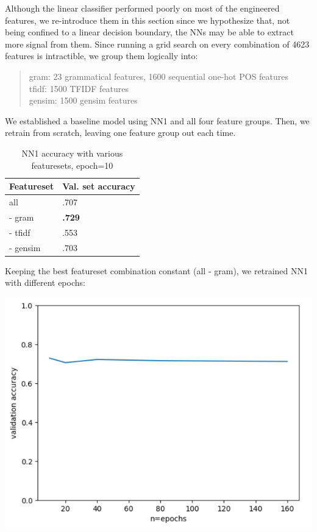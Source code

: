 \documentclass[8pt]{article}
\begin{document}
Although the linear classifier performed poorly on most of the engineered features, we re-introduce them in this section since we hypothesize that, not being confined to a linear decision boundary, the NNs may be able to extract more signal from them. Since running a grid search on every combination of 4623 features is intractible, we group them logically into:
\begin{quote}
  gram: 23 grammatical features, 1600 sequential one-hot POS features\\
  tfidf: 1500 TFIDF features\\
  gensim: 1500 gensim features\\
\end{quote}
We established a baseline model using NN1 and all four feature groups. Then, we retrain from scratch, leaving one feature group out each time.
\vskip 0.2in
\begin{table}[h]
  \centering
  \begin{tabular}{|l|l|}
    \hline
    Featureset  & Val. set accuracy \\
    \hline
    all      & .707 \\
      - gram  & \textbf{.729} \\
      - tfidf & .553 \\
      - gensim  & .703 \\
    \hline
  \end{tabular}
  \caption{NN1 accuracy with various featuresets, epoch=10}
  \label{tab:nn1-featuresets}
\end{table}
\vskip 0.2in
Keeping the best featureset combination constant (all - gram), we retrained NN1 with different epochs:


\includegraphics[scale=.45, center]{images/epochs.png}
\end{document}
